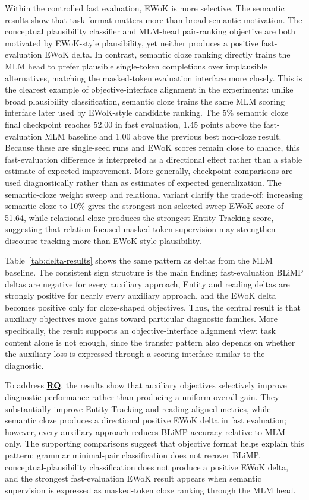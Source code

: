 \documentclass[11pt]{article}
\begin{document}
Within the controlled fast evaluation, EWoK is more selective.
The semantic results show that task format matters more than broad semantic motivation.
The conceptual plausibility classifier and MLM-head pair-ranking objective are both motivated by EWoK-style plausibility, yet neither produces a positive fast-evaluation EWoK delta.
In contrast, semantic cloze ranking directly trains the MLM head to prefer plausible single-token completions over implausible alternatives, matching the masked-token evaluation interface more closely.
This is the clearest example of objective-interface alignment in the experiments: unlike broad plausibility classification, semantic cloze trains the same MLM scoring interface later used by EWoK-style candidate ranking.
The 5\% semantic cloze final checkpoint reaches 52.00 in fast evaluation, 1.45 points above the fast-evaluation MLM baseline and 1.00 above the previous best non-cloze result.
Because these are single-seed runs and EWoK scores remain close to chance, this fast-evaluation difference is interpreted as a directional effect rather than a stable estimate of expected improvement.
More generally, checkpoint comparisons are used diagnostically rather than as estimates of expected generalization.
The semantic-cloze weight sweep and relational variant clarify the trade-off: increasing semantic cloze to 10\% gives the strongest non-selected sweep EWoK score of 51.64, while relational cloze produces the strongest Entity Tracking score, suggesting that relation-focused masked-token supervision may strengthen discourse tracking more than EWoK-style plausibility.



Table~\ref{tab:delta-results} shows the same pattern as deltas from the MLM baseline.
The consistent sign structure is the main finding: fast-evaluation BLiMP deltas are negative for every auxiliary approach, Entity and reading deltas are strongly positive for nearly every auxiliary approach, and the EWoK delta becomes positive only for cloze-shaped objectives.
Thus, the central result is that auxiliary objectives move gains toward particular diagnostic families.
More specifically, the result supports an objective-interface alignment view: task content alone is not enough, since the transfer pattern also depends on whether the auxiliary loss is expressed through a scoring interface similar to the diagnostic.

To address \hyperlink{rq:main}{\textcolor{black}{\textbf{RQ}}}, the results show that auxiliary objectives selectively improve diagnostic performance rather than producing a uniform overall gain.
They substantially improve Entity Tracking and reading-aligned metrics, while semantic cloze produces a directional positive EWoK delta in fast evaluation; however, every auxiliary approach reduces BLiMP accuracy relative to MLM-only.
The supporting comparisons suggest that objective format helps explain this pattern: grammar minimal-pair classification does not recover BLiMP, conceptual-plausibility classification does not produce a positive EWoK delta, and the strongest fast-evaluation EWoK result appears when semantic supervision is expressed as masked-token cloze ranking through the MLM head.
\end{document}
